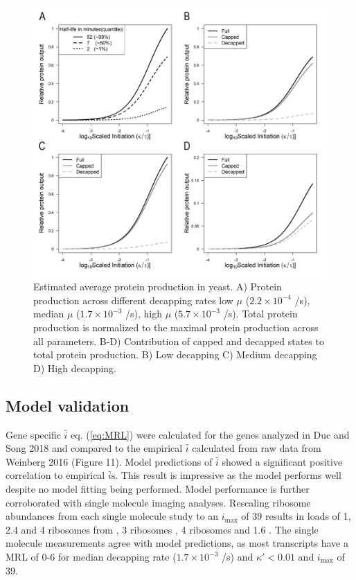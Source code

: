 \documentclass[a4,center,fleqn,nocrop]{NAR}
\newcommand{\imax}{\ensuremath{{i_{\max}}}\xspace}
\newcommand{\MRL}{\ensuremath{\bar{i}}\xspace}
\newcommand{\MRLs}{\ensuremath{\bar{i}\text{s}}\xspace}
\begin{document}
\begin{figure}[!ht]
\begin{center}
\includegraphics[width = 120mm]{Images/2023-07-17_Protein_Production_v2.png}
\caption{Estimated average protein production in yeast.  A) Protein production across different decapping rates  low $\mu$ ($2.2\times 10^{-4}$ /s), median $\mu$ ($1.7\times 10^{-3}$ /s), high $\mu$ ($5.7\times 10^{-3}$ /s). Total protein production is normalized to the maximal protein production across all parameters. B-D) Contribution of capped and decapped states to total protein production. B) Low decapping C) Medium decapping D) High decapping. }
\end{center}
\end{figure}


\subsection{Model validation}

Gene specific \MRL eq. (\ref{eq:MRL}) were calculated for the genes analyzed in Duc and Song 2018 and compared to the empirical \MRL calculated from raw data from Weinberg 2016 (Figure 11).
Model predictions of \MRL showed a significant positive correlation to empirical \MRLs.
This result is impressive as the model performs well despite no model fitting being performed.
Model performance is further corroborated with single molecule imaging analyses.
Rescaling ribosome abundances from each single molecule study to an \imax of 39 results in loads of 1, 2.4 and 4 ribosomes from \citep{RN30}, 3 ribosomes \citep{RN31}, 4 ribosomes \citep{RN32} and 1.6 \citep{RN33}.
The single molecule measurements agree with model predictions, as most transcripts have a MRL of 0-6 for median decapping rate ($1.7\times 10^{-3}$ /s) and  $\kappa' < 0.01$ and \imax of 39.
\end{document}
